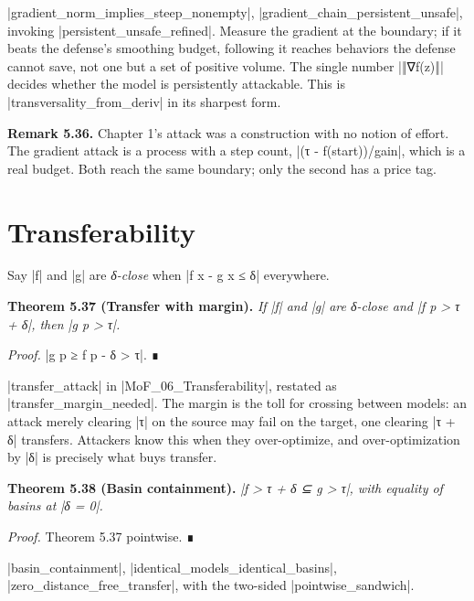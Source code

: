 \documentclass{memoir}
\begin{document}
\LeanVerb|gradient_norm_implies_steep_nonempty|, \LeanVerb|gradient_chain_persistent_unsafe|,
invoking \LeanVerb|persistent_unsafe_refined|. Measure the gradient at the boundary; if
it beats the defense's smoothing budget, following it reaches behaviors the
defense cannot save, not one but a set of positive volume. The single number
\LeanVerb|‖∇f(z)‖| decides whether the model is persistently attackable. This is
\LeanVerb|transversality_from_deriv| in its sharpest form.

\textbf{Remark 5.36.} Chapter 1's attack was a construction with no notion of effort. The
gradient attack is a process with a step count, \LeanVerb|(τ - f(start))/gain|, which is
a real budget. Both reach the same boundary; only the second has a price tag.



\section{Transferability}\label{Two--Schemas--of--Impossibility-005F-005F-005F--Machine--Checked--Limits--of--Trustworthy--Machine--Learning-005F-005F-005F--and--Why--They--Tighten--with--Capability----The--Geometry--of--Attacks----Transferability}

Say \LeanVerb|f| and \LeanVerb|g| are \emph{δ-close} when \LeanVerb|f x - g x ≤ δ| everywhere.

\textbf{Theorem 5.37 (Transfer with margin).} \emph{If \LeanVerb|f| and \LeanVerb|g| are δ-close and \LeanVerb|f p > τ + δ|,
then \LeanVerb|g p > τ|.}

\emph{Proof.} \LeanVerb|g p ≥ f p - δ > τ|. ∎

\LeanVerb|transfer_attack| in \LeanVerb|MoF_06_Transferability|, restated as
\LeanVerb|transfer_margin_needed|. The margin is the toll for crossing between models: an
attack merely clearing \LeanVerb|τ| on the source may fail on the target, one clearing \LeanVerb|τ + δ|
transfers. Attackers know this when they over-optimize, and over-optimization by
\LeanVerb|δ| is precisely what buys transfer.

\textbf{Theorem 5.38 (Basin containment).} \emph{\LeanVerb|f > τ + δ ⊆ g > τ|, with equality of basins at
\LeanVerb|δ = 0|.}

\emph{Proof.} Theorem 5.37 pointwise. ∎

\LeanVerb|basin_containment|, \LeanVerb|identical_models_identical_basins|,
\LeanVerb|zero_distance_free_transfer|, with the two-sided \LeanVerb|pointwise_sandwich|.
\end{document}
